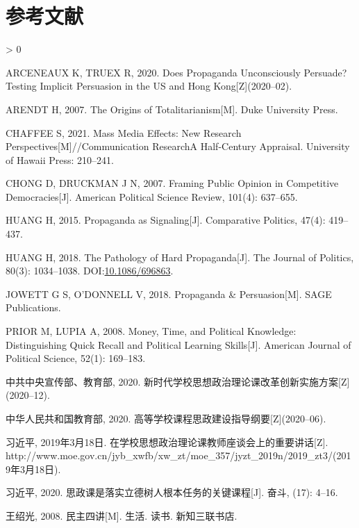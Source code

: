 \documentclass[
  12pt,
]{ctexart}
\newlength{\cslhangindent}
\newenvironment{CSLReferences}[2] %
 {%
  \setlength{\parindent}{0pt}
  \ifodd #1 \everypar{\setlength{\hangindent}{\cslhangindent}}\ignorespaces\fi
  \ifnum #2 > 0
  \setlength{\parskip}{#2\baselineskip}
  \fi
 }%
 {}
\begin{document}
\newpage

\hypertarget{ux53c2ux8003ux6587ux732e}{%
\section*{参考文献}\label{ux53c2ux8003ux6587ux732e}}

\hypertarget{refs}{}
\begin{CSLReferences}{1}{0}
\leavevmode\hypertarget{ref-ArceneauxTruex2020}{}%
ARCENEAUX K, TRUEX R, 2020. Does {Propaganda Unconsciously Persuade}? {Testing Implicit Persuasion} in the {US} and {Hong Kong}{[}Z{]}(2020--02).

\leavevmode\hypertarget{ref-Arendt2007}{}%
ARENDT H, 2007. The Origins of Totalitarianism{[}M{]}. {Duke University Press}.

\leavevmode\hypertarget{ref-Chaffee2021}{}%
CHAFFEE S, 2021. Mass Media Effects: {New} Research Perspectives{[}M{]}//Communication Research{{A}} Half-Century Appraisal. {University of Hawaii Press}: 210--241.

\leavevmode\hypertarget{ref-ChongDruckman2007}{}%
CHONG D, DRUCKMAN J N, 2007. Framing Public Opinion in Competitive Democracies{[}J{]}. American Political Science Review, 101(4): 637--655.

\leavevmode\hypertarget{ref-Huang2015a}{}%
HUANG H, 2015. Propaganda as {Signaling}{[}J{]}. Comparative Politics, 47(4): 419--437.

\leavevmode\hypertarget{ref-Huang2018}{}%
HUANG H, 2018. The {Pathology} of {Hard Propaganda}{[}J{]}. The Journal of Politics, 80(3): 1034--1038. DOI:\href{https://doi.org/10.1086/696863}{10.1086/696863}.

\leavevmode\hypertarget{ref-JowettODonnell2018}{}%
JOWETT G S, O'DONNELL V, 2018. Propaganda \& {Persuasion}{[}M{]}. {SAGE Publications}.

\leavevmode\hypertarget{ref-PriorLupia2008}{}%
PRIOR M, LUPIA A, 2008. Money, Time, and Political Knowledge: {Distinguishing} Quick Recall and Political Learning Skills{[}J{]}. American Journal of Political Science, 52(1): 169--183.

\leavevmode\hypertarget{ref-ZhongGongZhongYangXuanChuanBuJiaoYuBu2020}{}%
中共中央宣传部、教育部, 2020. 新时代学校思想政治理论课改革创新实施方案{[}Z{]}(2020--12).

\leavevmode\hypertarget{ref-ZhongHuaRenMinGongHeGuoJiaoYuBu2020}{}%
中华人民共和国教育部, 2020. 高等学校课程思政建设指导纲要{[}Z{]}(2020--06).

\leavevmode\hypertarget{ref-XiJinPing2019}{}%
习近平, 2019年3月18日. 在学校思想政治理论课教师座谈会上的重要讲话{[}Z{]}. http://www.moe.gov.cn/jyb\_xwfb/xw\_zt/moe\_357/jyzt\_2019n/2019\_zt3/(2019年3月18日).

\leavevmode\hypertarget{ref-XiJinPing2020}{}%
习近平, 2020. {思政课是落实立德树人根本任务的关键课程}{[}J{]}. 奋斗, (17): 4--16.

\leavevmode\hypertarget{ref-WangShaoGuang2008}{}%
王绍光, 2008. {民主四讲}{[}M{]}. {生活. 读书. 新知三联书店}.

\end{CSLReferences}
\end{document}
